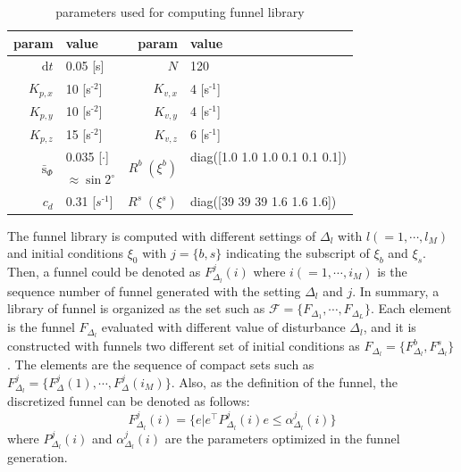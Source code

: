 \documentclass[letterpaper, 10 pt, conference]{ieeeconf}  %
\begin{document}
\begin{table}[b]
\begin{center}
\begin{tabular}{|r|l||r|l|} 
\hline
param & value & param & value \\ \hline \hline
$\text{d}t$ & 0.05 [s] & $N$ & 120 \\ \hline
$K_{p,x}$ & 10 [s$^\text{-2}$] & $K_{v,x}$ & 4 [s$^\text{-1}$] \\ \hline
$K_{p,y}$ & 10 [s$^\text{-2}$] & $K_{v,y}$ & 4 [s$^\text{-1}$] \\ \hline
$K_{p,z}$ & 15 [s$^\text{-2}$] & $K_{v,z}$ & 6 [s$^\text{-1}$] \\ \hline
\multirow{2}{*}{$\bar{\text{s}}_\Phi$} & 0.035 [$\cdot$] & \multirow{2}{*}{$R^b\;(\xi^b)$} & diag([1.0 1.0 1.0 0.1 0.1 0.1]) \\ 
& $\approx\sin2^\circ$ & & \;\;\;\;\;\;\;\;\;\;\;\;\;\;\;\;\;\;\;\;\;\;\;\; \\ \hline
$c_d$ & 0.31 [$s^\text{-1}$]                         & $R^s\;(\xi^s)$ & diag([39 39 39 1.6 1.6 1.6]) \\ \hline
\end{tabular}
\caption{parameters used for computing funnel library} \label{table:settings} 
\end{center}
\end{table}

The funnel library is computed with different settings of $\Delta_l$ with $l(=1,\cdots,l_{M})$ and initial conditions $\xi_0$ with $j=\{b,s\}$ indicating the subscript of $\xi_b$ and $\xi_s$.
Then, a funnel could be denoted as $F_{\Delta_l}^j(i)$ where $i(=1,\cdots,i_{M})$ is the sequence number of funnel generated with the setting $\Delta_l$ and $j$.
In summary, a library of funnel is organized as the set such as $\mathcal{F} = \{F_{\Delta_1},\cdots,F_{\Delta_L}\}$.
Each element is the funnel $F_{\Delta_l}$ evaluated with different value of disturbance $\Delta_l$, 
and it is constructed with funnels two different set of initial conditions as $F_{\Delta_l} = \{F_{\Delta_l}^b,F_{\Delta_l}^s\}$. The elements are the sequence of compact sets such as $F_{\Delta_l}^j = \{F_{\Delta}^j(1),\cdots,F_{\Delta}^j(i_{M})\}$.
Also, as the definition of the funnel, the discretized funnel can be denoted as follows:
\begin{equation}
F_{\Delta_l}^j(i) = \{e| e^\top P_{\Delta_l}^j(i) e \leq  \alpha_{\Delta_l}^j(i)\} \label{eq:discreteFunnel}
\end{equation}
where $P_{\Delta_l}^j(i)$ and $\alpha_{\Delta_l}^j(i)$ are the parameters optimized in the funnel generation.
\end{document}

